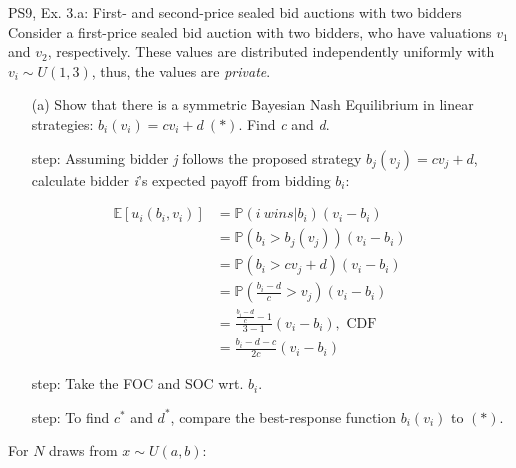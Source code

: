 \begin{frame}{PS9, Ex. 3.a: First- and second-price sealed bid auctions with two bidders}
    Consider a first-price sealed bid auction with two bidders, who have valuations $v_1$ and $v_2$, respectively. These values are distributed independently uniformly with $v_i\sim U(1,3)$, thus, the values are \textit{private}.
    \vspace{-4pt}
    \begin{itemize}
      \item[(a)] Show that there is a symmetric Bayesian Nash Equilibrium in linear strategies: $b_i(v_i) = cv_i + d\ (*)$. Find \textit{c} and \textit{d}.
    \end{itemize}
    \vspace{-8pt}
    \begin{multicols}{2}
      \begin{itemize}
        \item[\nth{1} step:] Assuming bidder \textit{j} follows the proposed strategy $b_j(v_j) = cv_j + d$, calculate bidder \textit{i}'s expected payoff from bidding $b_i$:
      \end{itemize}
      \vspace{-12pt}
      \begin{align*}
        \mathbb{E}[u_i(b_i,v_i)]&=\mathbb{P}(i\ wins|b_i)(v_i-b_i)\\
                                &=\mathbb{P}(b_i>b_j(v_j))(v_i-b_i)\\
                                &=\mathbb{P}(b_i>cv_j+d)(v_i-b_i)\\
                                &=\mathbb{P}\left(\frac{b_i-d}{c}>v_j\right)(v_i-b_i)\\
                                &=\frac{\frac{b_i-d}{c}-1}{3-1}(v_i-b_i),\text{ CDF}\\
                                &=\frac{b_i-d-c}{2c}(v_i-b_i)
      \end{align*}
      \vspace{-18pt}
      \begin{itemize}
        \item[\nth{2} step:] Take the FOC and SOC wrt. $b_i$.
        \item[\nth{3} step:] To find $c^*$ and $d^*$, compare the best-response function $b_i(v_i)$ to $(*)$.
      \end{itemize}
      \vfill\null\columnbreak
      For $N$ draws from $x\sim U(a, b):$
      \vspace{-6pt}
      \begin{enumerate}

\end{enumerate}
\end{multicols}
\end{frame}
